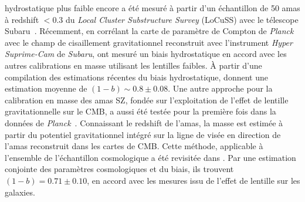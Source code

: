 hydrostatique plus faible encore a été mesuré à partir d'un
échantillon de 50 amas à redshift $<0.3$ du \emph{Local Cluster
Substructure Survey} (LoCuSS) avec le télescope
Subaru~\citep{Smith2016}. Récemment, en corrélant la carte de
paramètre de Compton de \emph{Planck} avec le champ de cisaillement
gravitationnel reconstruit avec l'instrument \emph{Hyper Suprime-Cam}
de \emph{Subaru}, \citet{Osato2019} ont mesuré un biais hydrostatique
en accord avec les autres calibrations en masse utilisant les lentilles
faibles. \`A partir d'une compilation des estimations récentes 
du biais hydrostatique, \citet{Salvati2018}
donnent une estimation moyenne de $(1-b) \sim 0.8 \pm 0.08$. 
Une autre approche pour la calibration en masse des amas SZ, fondée
sur l'exploitation de l'effet de lentille gravitationnelle sur le CMB,
a aussi été testée pour la première fois dans la données
de \emph{Planck}~\citep{Melin2015, Planck_2016_SZ_cosmo}. Connaissant
le redshift de l'amas, la masse est estimée à partir du potentiel
gravitationnel intégré sur la ligne de visée en direction de l'amas
reconstruit dans les cartes de CMB.
Cette méthode, applicable à l'ensemble de l'échantillon cosmologique a été
revisitée dans \citet{Zulbedia2019}. Par une estimation conjointe des
paramètres cosmologiques et du biais, ils trouvent $(1-b) = 0.71 \pm
0.10$, en accord avec les mesures issu de l'effet de lentille sur les
galaxies.


